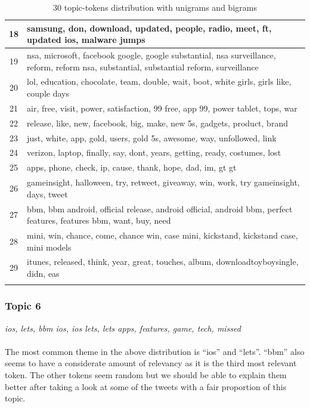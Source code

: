 \begin{longtable}{c p{16cm}}
   18   & samsung, don, download, updated, people, radio, meet, ft, updated ios, malware jumps \\ \midrule
   19   & nsa, microsoft, facebook google, google substantial, nsa surveillance, reform, reform nsa, substantial, substantial reform, surveillance \\ \midrule
   20   & lol, education, chocolate, team, double, wait, boot, white girls, girls like, couple days \\ \midrule
   21   & air, free, visit, power, satisfaction, 99 free, app 99, power tablet, tops, war \\ \midrule
   22   & release, like, new, facebook, big, make, new 5s, gadgets, product, brand \\ \midrule
   23   & just, white, app, gold, users, gold 5s, awesome, way, unfollowed, link \\ \midrule
   24   & verizon, laptop, finally, say, dont, years, getting, ready, costumes, lost \\ \midrule
   25   & apps, phone, check, ip, cause, thank, hope, dad, im, gt gt \\ \midrule
   26   & gameinsight, halloween, try, retweet, giveaway, win, work, try gameinsight, days, tweet \\ \midrule
   27   & bbm, bbm android, official release, android official, android bbm, perfect features, features bbm, want, buy, need \\ \midrule
   28   & mini, win, chance, come, chance win, case mini, kickstand, kickstand case, mini models \\ \midrule
   29   & itunes, released, think, year, great, touches, album, downloadtoyboysingle, didn, eas \\ \bottomrule
\caption{30 topic-tokens distribution with unigrams and bigrams}
\label{tab:30-topics}
\end{longtable}



\subsubsection{Topic 6}
\label{sec:topic-6}
\textit{ios, lets, bbm ios, ios lets, lets apps, features, game, tech, missed} \\\\
The most common theme in the above distribution is ``ios'' and ``lets''. ``bbm'' also seems to have
a considerate amount of relevancy as it is the third most relevant token. The other tokens seem
random but we should be able to explain them better after taking a look at some of the tweets with a
fair proportion of this topic.

